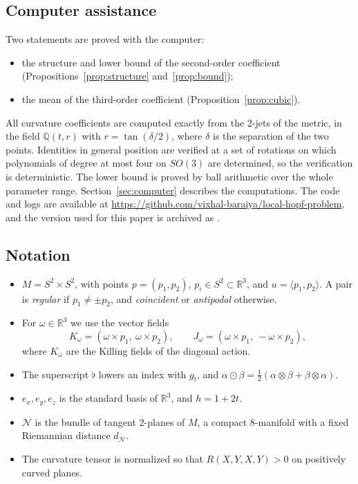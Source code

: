 \documentclass[11pt]{amsart}
\theoremstyle{definition}
\theoremstyle{remark}
\newcommand{\R}{\mathbb{R}}
\newcommand{\Q}{\mathbb{Q}}
\newcommand{\Gr}{\mathcal{N}}
\newcommand{\sym}{\odot}
\newcommand{\codeurl}{\url{https://github.com/vixhal-baraiya/local-hopf-problem}}
\begin{document}
\subsection*{Computer assistance}
Two statements are proved with the computer:
\begin{itemize}[leftmargin=*]
\item the structure and lower bound of the second-order coefficient (Propositions~\ref{prop:structure} and~\ref{prop:bound});
\item the mean of the third-order coefficient (Proposition~\ref{prop:cubic}).
\end{itemize}
All curvature coefficients are computed exactly from the $2$-jets of the metric, in the field $\Q(t,r)$ with $r=\tan(\delta/2)$, where $\delta$ is the separation of the two points. Identities in general position are verified at a set of rotations on which polynomials of degree at most four on $SO(3)$ are determined, so the verification is deterministic. The lower bound is proved by ball arithmetic over the whole parameter range. Section~\ref{sec:computer} describes the computations. The code and logs are available at \codeurl, and the version used for this paper is archived as \cite{code}.

\subsection*{Notation}
\begin{itemize}[leftmargin=*]
\item $M=S^2\times S^2$, with points $p=(p_1,p_2)$, $p_i\in S^2\subset\R^3$, and $u=\langle p_1,p_2\rangle$. A pair is \emph{regular} if $p_1\ne\pm p_2$, and \emph{coincident} or \emph{antipodal} otherwise.
\item For $\omega\in\R^3$ we use the vector fields
\[ K_\omega=(\omega\times p_1,\ \omega\times p_2),\qquad J_\omega=(\omega\times p_1,\ -\omega\times p_2), \]
where $K_\omega$ are the Killing fields of the diagonal action.
\item The superscript $\flat$ lowers an index with $g_t$, and $\alpha\sym\beta=\frac12(\alpha\otimes\beta+\beta\otimes\alpha)$.
\item $e_x,e_y,e_z$ is the standard basis of $\R^3$, and $h=1+2t$.
\item $\Gr$ is the bundle of tangent $2$-planes of $M$, a compact $8$-manifold with a fixed Riemannian distance $d_\Gr$.
\item The curvature tensor is normalized so that $R(X,Y,X,Y)>0$ on positively curved planes.
\end{itemize}
\end{document}
